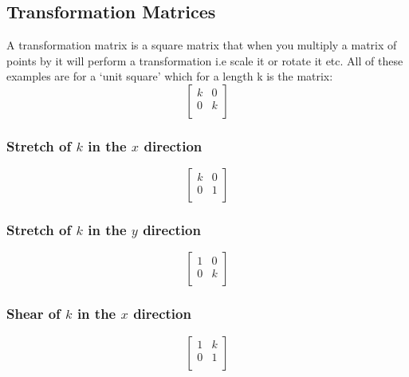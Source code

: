 \documentclass[12pt] {article}
\begin{document}
\newpage

\begin{definition}

\subsection*{Transformation Matrices }
A transformation matrix is a square matrix that when you multiply a matrix of points by it 
will perform a transformation i.e scale it or rotate it etc. All of these examples are for 
a `unit square' which for a length k is the matrix:
\begin{equation*}
  \begin{bmatrix}
    k & 0 \\
    0 & k \\
  \end{bmatrix}
\end{equation*}

\subsubsection*{Stretch of $k$ in the $x$ direction}
\begin{equation*}
  \begin{bmatrix}
    k & 0 \\
    0 & 1 \\
  \end{bmatrix}
\end{equation*}

\subsubsection*{Stretch of $k$ in the $y$ direction}
\begin{equation*}
  \begin{bmatrix}
    1 & 0 \\
    0 & k \\
  \end{bmatrix}
\end{equation*}
\subsubsection*{Shear of $k$ in the $x$ direction }
\begin{equation*}
  \begin{bmatrix}
    1 & k \\
    0 & 1 \\
  \end{bmatrix}
\end{equation*}


\end{definition}
\end{document}

